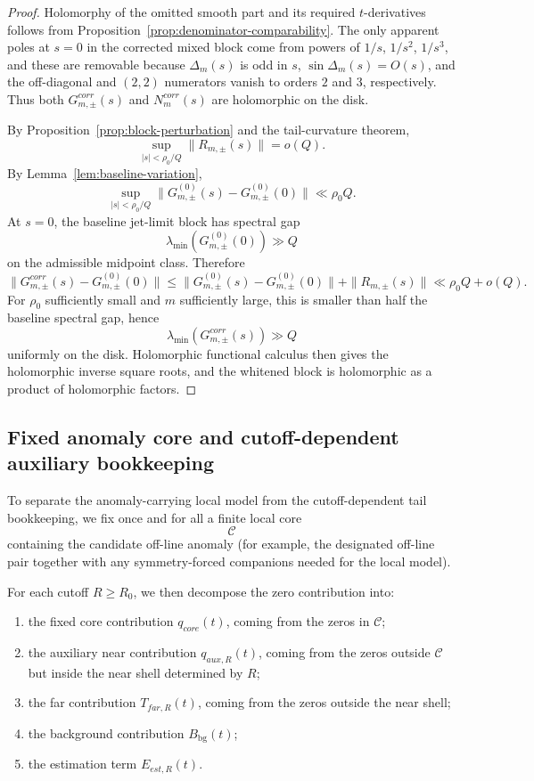 \documentclass[11pt,a4paper]{amsart}
\def\corr{corr}%
\def\far{far}%
\def\est{est}%
\def\core{core}%
\def\aux{aux}%
\theoremstyle{plain}
\theoremstyle{definition}
\newcommand{\far}{\mathrm{far}}
\newcommand{\est}{\mathrm{est}}
\newcommand{\corr}{\mathrm{corr}}
\newcommand{\bg}{\mathrm{bg}}
\newcommand{\core}{\mathrm{core}}
\newcommand{\aux}{\mathrm{aux}}
\begin{document}
\begin{proof}
Holomorphy of the omitted smooth part and its required $t$-derivatives follows
from Proposition~\ref{prop:denominator-comparability}. The only apparent poles
at $s=0$ in the corrected mixed block come from powers of $1/s$, $1/s^2$,
$1/s^3$, and these are removable because $\Delta_m(s)$ is odd in $s$,
$\sin \Delta_m(s)=O(s)$, and the off-diagonal and $(2,2)$ numerators vanish
to orders $2$ and $3$, respectively. Thus both $G_{m,\pm}^{\corr}(s)$ and
$N_m^{\corr}(s)$ are holomorphic on the disk.

By Proposition~\ref{prop:block-perturbation} and the tail-curvature theorem,
\[
\sup_{|s|<\rho_0/Q}\|R_{m,\pm}(s)\|=o(Q).
\]
By Lemma~\ref{lem:baseline-variation},
\[
\sup_{|s|<\rho_0/Q}
\|G_{m,\pm}^{(0)}(s)-G_{m,\pm}^{(0)}(0)\|
\ll \rho_0 Q.
\]
At $s=0$, the baseline jet-limit block has spectral gap
\[
\lambda_{\min}(G_{m,\pm}^{(0)}(0))\gg Q
\]
on the admissible midpoint class. Therefore
\[
\|G_{m,\pm}^{\corr}(s)-G_{m,\pm}^{(0)}(0)\|
\le
\|G_{m,\pm}^{(0)}(s)-G_{m,\pm}^{(0)}(0)\|
+
\|R_{m,\pm}(s)\|
\ll
\rho_0 Q + o(Q).
\]
For $\rho_0$ sufficiently small and $m$ sufficiently large, this is smaller
than half the baseline spectral gap, hence
\[
\lambda_{\min}(G_{m,\pm}^{\corr}(s))\gg Q
\]
uniformly on the disk. Holomorphic functional calculus then gives the
holomorphic inverse square roots, and the whitened block is holomorphic as a
product of holomorphic factors.
\end{proof}

\subsection{Fixed anomaly core and cutoff-dependent auxiliary bookkeeping}
\label{subsec:fixed-core}

To separate the anomaly-carrying local model from the cutoff-dependent tail
bookkeeping, we fix once and for all a finite local core
\[
\mathcal C
\]
containing the candidate off-line anomaly (for example, the designated off-line
pair together with any symmetry-forced companions needed for the local model).

For each cutoff $R\ge R_0$, we then decompose the zero contribution into:
\begin{enumerate}
\item the fixed core contribution $q_{\core}(t)$, coming from the zeros in
$\mathcal C$;
\item the auxiliary near contribution $q_{\aux,R}(t)$, coming from the zeros
outside $\mathcal C$ but inside the near shell determined by $R$;
\item the far contribution $T_{\far,R}(t)$, coming from the zeros outside the
near shell;
\item the background contribution $B_{\bg}(t)$;
\item the estimation term $E_{\est,R}(t)$.
\end{enumerate}
\end{document}
